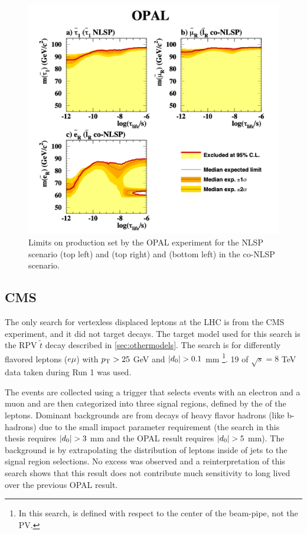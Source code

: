 \begin{figure}[!h]
\centering
\includegraphics[width=.6\textwidth]{figures/theory/opal-limit.png}
\caption{Limits on \slep production set by the OPAL experiment for the \stau \ac{NLSP} scenario (top left) and \smu (top right) and \selec (bottom left) in the co-\ac{NLSP} scenario.}
\label{fig:opal-limit}
\end{figure}


\subsection{CMS}
\label{sec:cms-limit}

The only search for vertexless displaced leptons at the \ac{LHC} is from the \ac{CMS} experiment, and it did not target \slep decays. The target model used for this search is the RPV $\tilde{t}$ decay described in \autoref{sec:othermodels}. The search is for differently flavored leptons ($e\mu$) with $p_{\text{T}} > 25$ GeV and $|d_0| > 0.1$ mm \footnote{ In this search, \dz is defined with respect to the center of the beam-pipe, not the \ac{PV}.}. 19 \ifb of $\sqrt{s} = 8$ TeV data taken during Run 1 was used.  

The events are collected using a trigger that selects events with an electron and a muon and are then categorized into three signal regions, defined by the \absdz of the leptons. Dominant backgrounds are from decays of heavy flavor hadrons (like b-hadrons) due to the small impact parameter requirement (the search in this thesis requires $|d_0| > 3$ mm and the OPAL result requires $|d_0| > 5$ mm). The background is by extrapolating the \absdz distribution of leptons inside of jets to the signal region selections. No excess was observed and a reinterpretation of this search \cite{jesseshelton} shows that this result does not contribute much sensitivity to long lived \slep over the previous OPAL result.



